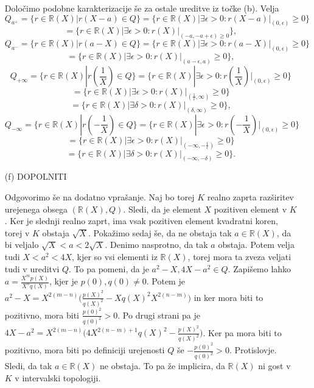 \documentclass[a4paper, 12pt]{article}
\newcommand{\R}{\mathbb{R}}
\begin{document}
\begin{enumerate}
Določimo podobne karakterizacije še za ostale ureditve iz točke (b). Velja 
$$
Q_{a^+} = \{r\in \R(X)| r(X-a) \in Q\} = \{r\in \R(X)| \exists \epsilon >0: r(X-a)|_{(0,\epsilon)} \ge 0\}
$$
$$
= \{r\in \R(X)| \exists \epsilon >0: r(X)|_{(-a,-a+\epsilon) \ge 0}\},
$$
$$
Q_{a^-} = \{r\in \R(X)|r(a-X) \in Q\} =  \{ r\in \R(X)|\exists \epsilon >0: r(a-X)|_{(0,\epsilon)}\ge 0\}
$$
$$
= \{r\in \R(X)| \exists \epsilon >0: r(X)|_{(a-\epsilon,a)} \ge 0\},
$$
$$
Q_{+\infty} = \{r\in \R(X)|r(\frac{1}{X}) \in Q\} = \{r\in \R(X)|\exists \epsilon >0: r(\frac{1}{X})|_{(0,\epsilon)} \ge 0\}
$$
$$
= \{r\in \R(X)| \exists \epsilon >0 : r(X)|_{(\frac{1}{\epsilon},\infty)}\ge 0\} 
$$
$$
= \{r\in \R(X)| \exists \delta >0 : r(X)|_{(\delta,\infty)}\ge 0\},
$$
$$
Q_{-\infty} = \{r\in \R(X) | r(-\frac{1}{X}) \in Q\} = \{ r\in \R(X)| \exists \epsilon >0: r(-\frac{1}{X})|_{(0,\epsilon)} \ge 0 \}
$$
$$
= \{r\in \R(X)| \exists \epsilon >0 : r(X)|_{(-\infty, -\frac{1}{\epsilon})} \ge 0\}
$$
$$
=\{r\in \R(X)| \exists \delta > 0: r(X)|_{(-\infty,-\delta)} \ge 0\}.
$$

\item[(f)]
DOPOLNITI

Odgovorimo še na dodatno vprašanje. Naj bo torej $K$ realno zaprta razširitev urejenega obsega $(\R(X), Q)$. Sledi, da je element $X$ pozitiven element v $K$. Ker je slednji realno zaprt, ima vsak pozitiven element kvadratni koren, torej v $K$ obstaja $\sqrt{X}$. Pokažimo sedaj še, da ne obstaja tak $a\in \R(X)$, da bi veljalo $\sqrt{X} < a <2\sqrt{X}$. Denimo nasprotno, da tak $a$ obstaja. Potem velja tudi $X < a^2 < 4 X$, kjer so vsi elementi iz $\R(X)$, torej mora ta zveza veljati tudi v ureditvi $Q$. To pa pomeni, da je $a^2 - X, 4X - a^2 \in Q$. Zapišemo lahko $a = \frac{X^m p(X)}{X^n q(X)}$, kjer je $p(0),q(0)\neq 0$. Potem je $a^2 - X = X^{2(m-n)} \big( \frac{p(X)^2}{q(X)^2} - Xq(X)^2 X^{2(n-m)}  \big)$ in ker mora biti to pozitivno, mora biti $\frac{p(0)^2}{q(0)^2} >0$. Po drugi strani pa je $4X-a^2 = X^{2(m-n)} \big( 4X^{2(n-m) + 1}q(X) ^2 - \frac{p(X)^2}{q(X)^2}  \big)$. Ker pa mora biti to pozitivno, mora biti po definiciji urejenosti $Q$ še $-\frac{p(0)^2}{q(0)^2} >0 $. Protislovje. Sledi, da tak $a\in \R(X)$ ne obstaja. To pa že implicira, da $\R(X)$ ni gost v $K$ v intervalski topologiji. 

\end{enumerate}
\end{document}
